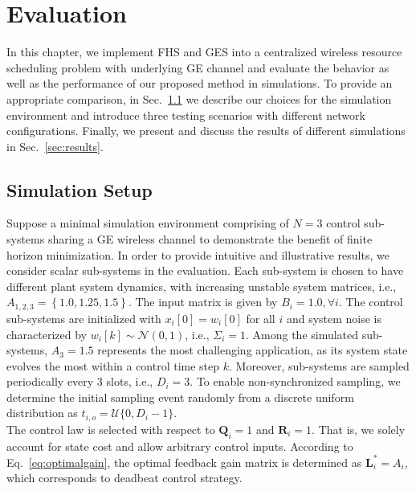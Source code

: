 \chapter{Evaluation} \label{ch:evaluation}

In this chapter, we implement FHS and GES into a centralized wireless resource
scheduling problem with underlying GE channel and evaluate the behavior as well
as the performance of our proposed method in simulations. To provide an
appropriate comparison, in Sec.~\ref{sec:setup} we describe our choices for the
simulation environment and introduce three testing scenarios with different
network configurations. Finally, we present and discuss the results of different
simulations in Sec.~\ref{sec:results}. 

\section{Simulation Setup} \label{sec:setup}

Suppose a minimal simulation environment comprising of $N=3$ control sub-systems
sharing a GE wireless channel to demonstrate the benefit of finite horizon
minimization. In order to provide intuitive and illustrative results, we
consider scalar sub-systems in the evaluation. Each sub-system is chosen to have
different plant system dynamics, with increasing unstable system matrices, i.e.,
$A_{1,2,3} = \left\{1.0, 1.25, 1.5\right\}$. The input matrix is given by $B_i =
1.0, \forall i$. The control sub-systems are initialized with $x_i[0] = w_i[0]$
for all $i$ and system noise is characterized by $w_i[k]\sim \mathcal{N}(0,1)$,
i.e., $\Sigma_i=1$. Among the simulated sub-systems, $A_3=1.5$ represents the
most challenging application, as its system state evolves the most within a
control time step $k$. Moreover, sub-systems are sampled periodically every 3
slots, i.e., $D_i=3$. To enable non-synchronized sampling, we determine the
initial sampling event randomly from a discrete uniform distribution as $t_{i,o}
= \mathcal{U}\{0, D_i-1\}$. \\
The control law is selected with respect to $\boldsymbol{Q}_i = 1$ and
$\boldsymbol{R}_i = 1$. That is, we solely account for state cost and allow
arbitrary control inputs. According to Eq.~\eqref{eq:optimalgain}, the optimal
feedback gain matrix is determined as $\boldsymbol{L}^*_i = A_i$, which
corresponds to deadbeat control strategy. 

